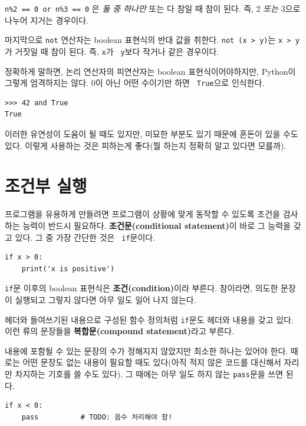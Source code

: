 \documentclass[10pt]{book}
\begin{document}
{\tt n\%2 == 0 or n\%3 == 0} 은 {\em 둘 중 하나만} 또는 { 다} 참일
때 참이 된다.  즉, 2 {\em 또는} 3으로 나누어 지거는 경우이다.

마지막으로 {\tt not} 연산자는 boolean 표현식의 반대 값을 취한다.  {\tt not
  (x > y)}는 {\tt x > y}가 거짓일 때 참이 된다.  즉, {\tt x}가 {\tt
  y}보다 작거나 같은 경우이다.

정확하게 말하면, 논리 연산자의 피연산자는 boolean 표현식이어야하지만,
Python이 그렇게 엄격하지는 않다.  0이 아닌 어떤 수이기만 하면 {\tt
  True}으로 인식한다.

\begin{verbatim}
>>> 42 and True
True
\end{verbatim}
%
이러한 유연성이 도움이 될 때도 있지만, 미묘한 부분도 있기 때문에 혼돈이
있을 수도 있다.  이렇게 사용하는 것은 피하는게 좋다(뭘 하는지 정확히
알고 있다면 모를까).


\section{조건부 실행}
\label{conditional.execution}


프로그램을 유용하게 만들려면 프로그램이 상황에 맞게 동작할 수 있도록
조건을 검사하는 능력이 반드시 필요하다.  {\bf 조건문(conditional
  statement)}이 바로 그 능력을 갖고 있다.  그 중 가장 간단한 것은 {\tt
  if}문이다.

\begin{verbatim}
if x > 0:
    print('x is positive')
\end{verbatim}
%
{\tt if}문 이후의 boolean 표현식은 {\bf 조건(condition)}이라 부른다.
참이라면, 의도한 문장이 실행되고 그렇지 않다면 아무 일도 일어 나지
않는다.

헤더와 들여쓰기된 내용으로 구성된 함수 정의처럼 {\tt if}문도 헤더와
내용을 갖고 있다.  이런 류의 문장들을 {\bf 복합문(compound
  statement)}라고 부른다.

내용에 포함될 수 있는 문장의 수가 정해지지 않았지만 최소한 하나는
있어야 한다.  때로는 어떤 문장도 없는 내용이 필요할 때도 있다(아직 적지
않은 코드를 대신해서 자리만 차지하는 기호를 쓸 수도 있다).  그 때에는
아무 일도 하지 않는 {\tt pass}문을 쓰면 된다.

\begin{verbatim}
if x < 0:
    pass          # TODO: 음수 처리해야 함!
\end{verbatim}
%
\end{document}
